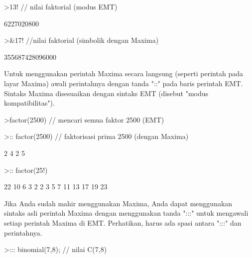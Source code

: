\documentclass[a4paper,10pt]{article}
\begin{document}
\begin{eulernotebook}
\begin{eulercomment}
\begin{eulercomment}
\begin{eulercomment}
\begin{eulercomment}
\begin{euleroutput}
\end{euleroutput}
\begin{eulerprompt}
>13! // nilai faktorial (modus EMT)
\end{eulerprompt}
\begin{euleroutput}
  6227020800
\end{euleroutput}
\begin{eulerprompt}
>&17! //nilai faktorial (simbolik dengan Maxima)
\end{eulerprompt}
\begin{euleroutput}
  
                             355687428096000
  
\end{euleroutput}
\begin{eulercomment}
Untuk menggunakan perintah Maxima secara langsung (seperti perintah pada layar
Maxima) awali perintahnya dengan tanda "::" pada baris perintah EMT. Sintaks
Maxima disesuaikan dengan sintaks EMT (disebut "modus kompatibilitas").
\end{eulercomment}
\begin{eulerprompt}
>factor(2500) // mencari semua faktor 2500 (EMT)
\end{eulerprompt}
\begin{euleroutput}
  [2,  2,  5,  5,  5,  5]
\end{euleroutput}
\begin{eulerprompt}
>:: factor(2500) // faktorisasi prima 2500 (dengan Maxima) 
\end{eulerprompt}
\begin{euleroutput}
  
                                   2  4
                                  2  5
  
\end{euleroutput}
\begin{eulerprompt}
>:: factor(25!)
\end{eulerprompt}
\begin{euleroutput}
  
                       22  10  6  3   2
                      2   3   5  7  11  13 17 19 23
  
\end{euleroutput}
\begin{eulercomment}
Jika Anda sudah mahir menggunakan Maxima, Anda dapat menggunakan sintaks asli
perintah Maxima dengan menggunakan tanda ":::" untuk mengawali setiap perintah
Maxima di EMT. Perhatikan, harus ada spasi antara ":::" dan perintahnya.
\end{eulercomment}
\begin{eulerprompt}
>::: binomial(7,8); // nilai C(7,8)
\end{eulerprompt}
\begin{euleroutput}
  

\end{euleroutput}
\end{eulercomment}
\end{eulercomment}
\end{eulercomment}
\end{eulercomment}
\end{eulernotebook}
\end{document}
